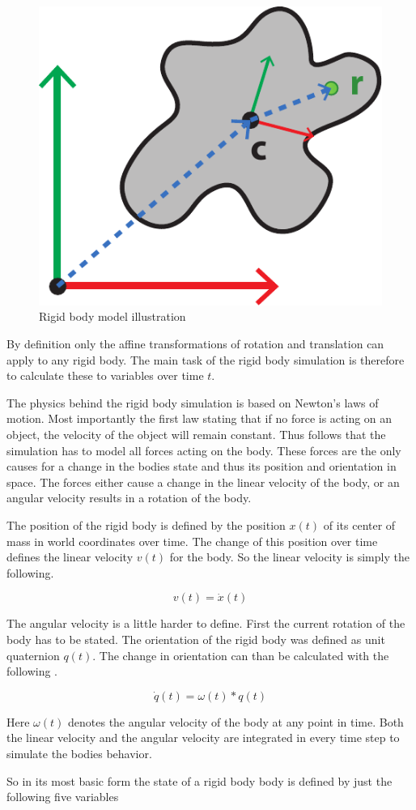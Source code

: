 \begin{figure}[htbp]
\centering
\includegraphics[width=.4\textwidth]{images/rigid_body_1.pdf}
\caption{Rigid body model illustration}
\label{img:rigid_body}
\end{figure}

By definition only the affine transformations of rotation and translation can apply to any rigid body. The main task of the rigid body simulation is therefore to calculate these to variables over time \(t\).

The physics behind the rigid body simulation is based on Newton's laws of motion. Most importantly the first law stating that if no force is acting on an object, the velocity of the object will remain constant. Thus follows that the simulation has to model all forces acting on the body. These forces are the only causes for a change in the bodies state and thus its position and orientation in space. The forces either cause a change in the linear velocity of the body, or an angular velocity results in a rotation of the body. 

The position of the rigid body is defined by the position $x(t)$ of its center of mass in world coordinates over time. The change of this position over time defines the linear velocity $v(t)$ for the body. So the linear velocity is simply the following.

\[
v(t) = \dot{x}(t)
\]

The angular velocity is a little harder to define. First the current rotation of the body has to be stated. The orientation of the rigid body was defined as unit quaternion $q(t)$. The change in orientation can than be calculated with the following .

\[
\dot{q}(t) = \omega(t) * q(t)
\]

Here $\omega(t)$ denotes the angular velocity of the body at any point in time. Both the linear velocity and the angular velocity are integrated in every time step to simulate the bodies behavior.

So in its most basic form the state of a rigid body body is defined by just the following five variables


